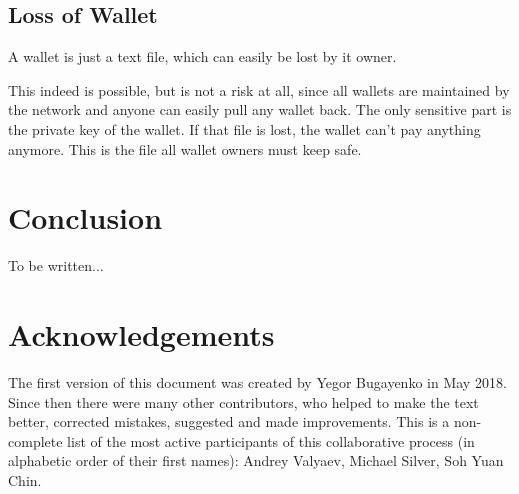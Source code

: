 \documentclass[11pt,oneside]{article}
\begin{document}
\subsection{Loss of Wallet}

A wallet is just a text file, which can easily be lost by it owner.

This indeed is possible, but is not a risk at all, since all wallets are
maintained by the network and anyone can easily pull any wallet back.
The only sensitive part is the private key of the wallet. If that file
is lost, the wallet can't pay anything anymore. This is the file all
wallet owners must keep safe.

\section{Conclusion}

To be written...

\section{Acknowledgements}

The first version of this document was created by Yegor Bugayenko in May 2018.
Since then there were many other contributors, who helped to make the text better,
corrected mistakes, suggested and made improvements. This is a non-complete list
of the most active participants of this collaborative process
(in alphabetic order of their first names):
%
Andrey Valyaev,
Michael Silver,
Soh Yuan Chin.


\printbibliography%
\end{document}
